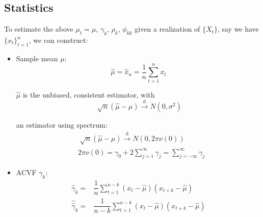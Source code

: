 \begin{itemize}[topsep=2pt,itemsep=0pt]
\begin{itemize}[topsep=2pt,itemsep=0pt]
            
            
        \end{itemize}
        
            

        
        
        
    \end{itemize}

\subsection{Statistics}

    To estimate the above $ \mu _t=\mu $, $ \gamma _k $, $ \rho _k $, $ \phi _{kk} $ given a realization of $ \{X_t\} $, say we have $ \{x_t\}_{t=1}^n $, we can construct:
    \begin{itemize}[topsep=2pt,itemsep=0pt]
        \item Sample mean $ \mu  $:
        \begin{equation}
            \hat{\mu }=\hat{x}_n=\dfrac{1}{n}\sum_{t=1}^nx_t 
        \end{equation}

        $ \hat{\mu } $ is the unbiased, consistent estimator, with
        \[
            \sqrt[]{n}(\hat{\mu }-\mu )\xrightarrow[]{\mathrm{d}} N(0,\sigma ^2) 
        \]
        
        an estimator using spectrum:
        \begin{align}
            &\sqrt[]{n}(\hat{\mu }-\mu )\xrightarrow[]{\mathrm{d}} N(0,2\pi \nu (0))\\
            &2\pi \nu (0)=\gamma _0+2\sum_{j=1}^\infty \gamma _j=\sum_{j=-\infty}^\infty \gamma _j 
        \end{align}
        
        \item ACVF $ \gamma _k $:
        \begin{align}
            \hat{\gamma }_k=&\dfrac{1}{n}\sum_{t=1}^{n-k}(x_t-\hat{\mu })(x_{t+k}-\hat{\mu }) \\
            \hat{\hat{\gamma }}_k=&\dfrac{1}{n-k}\sum_{t=1}^{n-k}(x_t-\hat{\mu })(x_{t+k}-\hat{\mu }) 
        \end{align}


\end{itemize}

